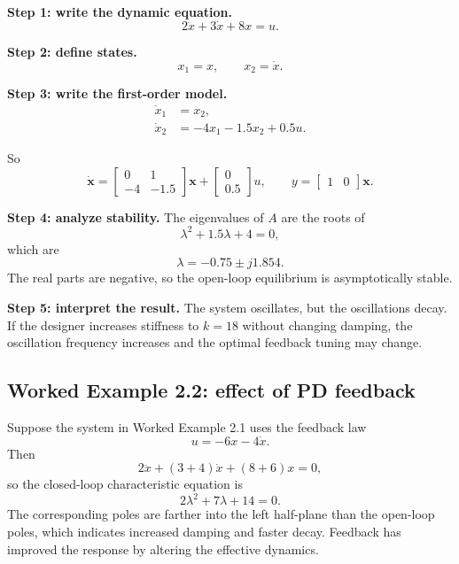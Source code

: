 \documentclass[11pt]{article}
\newcommand{\vect}[1]{\boldsymbol{#1}}
\newcommand{\state}{\vect{x}}
\begin{document}
\textbf{Step 1: write the dynamic equation.}
\begin{equation}
2\ddot{x}+3\dot{x}+8x=u.
\end{equation}

\textbf{Step 2: define states.}
\begin{equation}
 x_1=x, \qquad x_2=\dot{x}.
\end{equation}

\textbf{Step 3: write the first-order model.}
\begin{align}
\dot{x}_1 &= x_2, \\
\dot{x}_2 &= -4x_1-1.5x_2+0.5u.
\end{align}

So
\begin{equation}
\dot{\state}=
\begin{bmatrix}
0 & 1\\
-4 & -1.5
\end{bmatrix}\state
+
\begin{bmatrix}
0\\0.5
\end{bmatrix}u,
\qquad
y=\begin{bmatrix}1 & 0\end{bmatrix}\state.
\end{equation}

\textbf{Step 4: analyze stability.}
The eigenvalues of $A$ are the roots of
\begin{equation}
\lambda^2+1.5\lambda+4=0,
\end{equation}
which are
\begin{equation}
\lambda=-0.75\pm j1.854.
\end{equation}
The real parts are negative, so the open-loop equilibrium is asymptotically stable.

\textbf{Step 5: interpret the result.}
The system oscillates, but the oscillations decay. If the designer increases stiffness to $k=18$ without changing damping, the oscillation frequency increases and the optimal feedback tuning may change.

\subsection{Worked Example 2.2: effect of PD feedback}

Suppose the system in Worked Example 2.1 uses the feedback law
\begin{equation}
 u=-6x-4\dot{x}.
\end{equation}
Then
\begin{equation}
2\ddot{x} + (3+4)\dot{x} + (8+6)x = 0,
\end{equation}
so the closed-loop characteristic equation is
\begin{equation}
2\lambda^2 + 7\lambda + 14 = 0.
\end{equation}
The corresponding poles are farther into the left half-plane than the open-loop poles, which indicates increased damping and faster decay. Feedback has improved the response by altering the effective dynamics.
\end{document}
